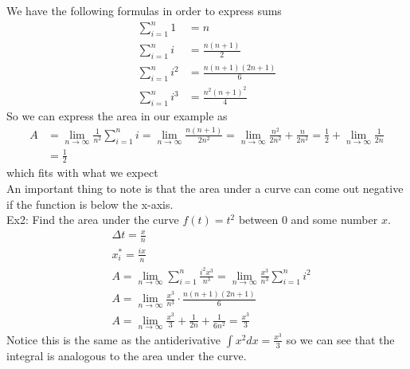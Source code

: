 We have the following formulas in order to express sums
\begin{align*}
    \sum_{i=1}^n1&=n\\
    \sum_{i=1}^ni&=\frac{n(n+1)}{2}\\
    \sum_{i=1}^ni^2&=\frac{n(n+1)(2n+1)}{6}\\
    \sum_{i=1}^ni^3&=\frac{n^2(n+1)^2}{4}
\end{align*}
So we can express the area in our example as
\begin{align*}
    A&=\lim_{n\to\infty}\frac{1}{n^2}\sum_{i=1}^ni=\lim_{n\to\infty}\frac{n(n+1)}{2n^2}=\lim_{n\to\infty}\frac{n^2}{2n^2}+\frac{n}{2n^2}=\frac{1}{2}+\lim_{n\to\infty}\frac{1}{2n}\\
    &=\frac{1}{2}
\end{align*}
which fits with what we expect\\
An important thing to note is that the area under a curve can come out negative if the function is below the x-axis.\\
Ex2: Find the area under the curve $f(t)=t^2$ between 0 and some number $x$.
\begin{align*}
    &\Delta t=\frac{x}{n}\\
    &x_i^*=\frac{ix}{n}\\
    &A=\lim_{n\to\infty}\sum_{i=1}^n\frac{i^2x^3}{n^3}=\lim_{n\to\infty}\frac{x^3}{n^3}\sum_{i=1}^ni^2\\
    &A=\lim_{n\to\infty}\frac{x^3}{n^3}\cdot\frac{n(n+1)(2n+1)}{6}\\
    &A=\lim_{n\to\infty}\frac{x^3}{3}+\frac{1}{2n}+\frac{1}{6n^2}=\frac{x^3}{3}
\end{align*}
Notice this is the same as the antiderivative $\int x^2dx=\frac{x^3}{3}$ so we can see that the integral is analogous to the area under the curve.\\

